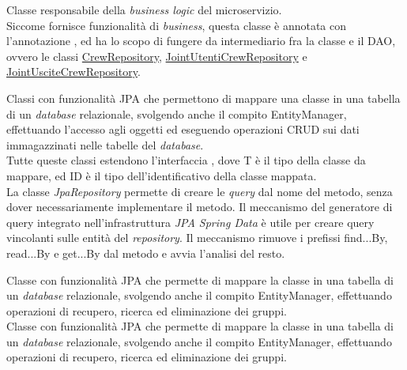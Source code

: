 Classe responsabile della \textit{business logic} del \gls{microservizio}.  \\
Siccome fornisce funzionalità di \textit{business}, questa classe è annotata con l'annotazione , ed ha lo scopo di fungere da intermediario fra la classe  e  il \gls{DAO}, ovvero le classi \hyperref[CrewRepository]{CrewRepository}, \hyperref[JointUtentiCrewRepository]{JointUtentiCrewRepository} e \hyperref[JointUsciteCrewRepository]{JointUsciteCrewRepository}. 

\label{Repository}
Classi con funzionalità \gls{JPA} che permettono di mappare una classe in una tabella di un \textit{database} relazionale, svolgendo anche il compito \gls{EntityManager}, effettuando l'accesso agli oggetti ed eseguendo operazioni \gls{CRUD} sui dati immagazzinati nelle tabelle del \textit{database}.\\
Tutte queste classi estendono l'interfaccia , dove T è il tipo della classe da mappare, ed ID è il tipo dell'identificativo della classe mappata.\\
La classe \textit{JpaRepository} permette di creare le \textit{query} dal nome del metodo, senza  dover necessariamente implementare il metodo.
Il meccanismo del generatore di query integrato nell'infrastruttura \textit{JPA Spring Data} è utile per creare query vincolanti sulle entità del \textit{repository}. Il meccanismo rimuove i prefissi find...By, read...By e get...By dal metodo e avvia l'analisi del resto.






\label{CrewRepository}
Classe con funzionalità \gls{JPA} che permette di mappare la classe  in una tabella di un \textit{database} relazionale, svolgendo anche il compito \gls{EntityManager}, effettuando operazioni di recupero, ricerca ed eliminazione dei gruppi.\\ 





Classe con funzionalità \gls{JPA} che permette di mappare la classe  in una tabella di un \textit{database} relazionale, svolgendo anche il compito \gls{EntityManager}, effettuando operazioni di recupero, ricerca ed eliminazione dei gruppi. 

